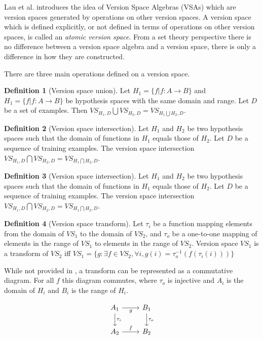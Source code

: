 \documentclass{article}
\theoremstyle{definition}
\newtheorem{definition}{Definition}[section]
\begin{document}
Lau et al.\cite{short} introduces the idea of Version Space Algebras (VSAs) which are version spaces generated by operations on other version spaces. A version space which is defined explicitly, or not defined in terms of operations on other version spaces, is called an \textit{atomic version space}. From a set theory perspective there is no difference between a version space algebra and a version space, there is only a difference in how they are constructed. 

There are three main operations defined on a version space. 
\begin{definition}[Version space union]
    Let $H_1 = \{f | f: A \rightarrow B\}$ and $H_1 = \{f | f: A \rightarrow B\}$ be hypothesis spaces with the same domain and range. Let $D$ be a set of examples. Then $VS_{H_1, D} \bigcup VS_{H_2, D} = VS_{H_1\bigcup H_2, D}$. 
\end{definition}

\begin{definition}[Version space intersection]
Let $H_1$ and $H_2$ be two hypothesis spaces such that the domain of functions in $H_1$ equals those of $H_2$. Let $D$ be a sequence of training examples. The version space intersection $VS_{H_1, D} \bigcap VS_{H_2, D} = VS_{H_1\bigcap H_2, D}$.
\end{definition}

\begin{definition}[Version space intersection]
Let $H_1$ and $H_2$ be two hypothesis spaces such that the domain of functions in $H_1$ equals those of $H_2$. Let $D$ be a sequence of training examples. The version space intersection $VS_{H_1, D} \bigcap VS_{H_2, D} = VS_{H_1\bigcap H_2, D}$.
\end{definition}

\begin{definition}[Version space transform]
Let $\tau_i$ be a function mapping elements from the domain of $VS_1$ to the domain of $VS_2$, and $\tau_o$ be a one-to-one mapping of elements in the range of $VS_1$ to elements in the range of $VS_2$. Version space $VS_1$ is a transform of $VS_2$ iff $VS_1 = \{g : \exists f \in VS_2, \forall i,  g(i) = \tau_o^{-1}(f(\tau_i(i)))\}$

While not provided in \cite{short}, a transform can be represented as a commutative diagram. For all $f$ this diagram commutes, where $\tau_o$ is injective and $A_i$ is the domain of $H_i$ and $B_i$ is the range of $H_i$. 

\[\begin{tikzcd}
	{A_1} & {B_1} \\
	{A_2} & {B_2}
	\arrow["{\tau_i}", from=1-1, to=2-1]
	\arrow["g"', from=1-1, to=1-2]
	\arrow["{\tau_o}", to=2-2, from=1-2]
	\arrow["f", from=2-1, to=2-2]
\end{tikzcd}\]

\end{definition}
\end{document}
